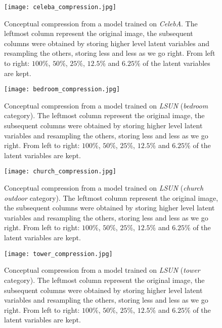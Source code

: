 \documentclass{article}
\begin{document}
\begin{figure}[H]
    \centering \texttt{[image: celeba\_compression.jpg]}
    \caption{Conceptual compression from a model trained on \emph{CelebA}. The leftmost column represent the original image, the subsequent columns were obtained by storing higher level latent variables and resampling the others, storing less and less as we go right. From left to right: $100\%$, $50\%$, $25\%$, $12.5\%$ and $6.25\%$ of the latent variables are kept.}
\end{figure}

\begin{figure}[H]
    \centering \texttt{[image: bedroom\_compression.jpg]}
    \caption{Conceptual compression from a model trained on \emph{LSUN} (\emph{bedroom} category). The leftmost column represent the original image, the subsequent columns were obtained by storing higher level latent variables and resampling the others, storing less and less as we go right. From left to right: $100\%$, $50\%$, $25\%$, $12.5\%$ and $6.25\%$ of the latent variables are kept.}
\end{figure}

\begin{figure}[H]
    \centering \texttt{[image: church\_compression.jpg]}
    \caption{Conceptual compression from a model trained on \emph{LSUN} (\emph{church outdoor} category). The leftmost column represent the original image, the subsequent columns were obtained by storing higher level latent variables and resampling the others, storing less and less as we go right. From left to right: $100\%$, $50\%$, $25\%$, $12.5\%$ and $6.25\%$ of the latent variables are kept.}
\end{figure}

\begin{figure}[H]
    \centering \texttt{[image: tower\_compression.jpg]}
    \caption{Conceptual compression from a model trained on \emph{LSUN} (\emph{tower} category). The leftmost column represent the original image, the subsequent columns were obtained by storing higher level latent variables and resampling the others, storing less and less as we go right. From left to right: $100\%$, $50\%$, $25\%$, $12.5\%$ and $6.25\%$ of the latent variables are kept.}
\end{figure}
\end{document}
